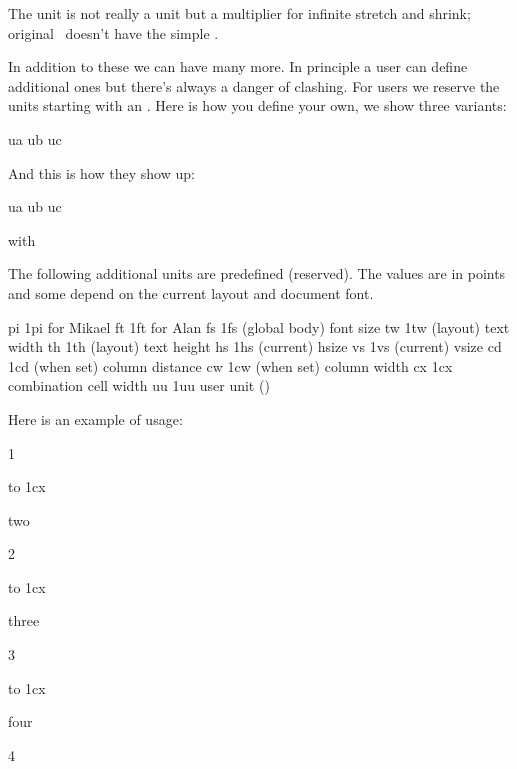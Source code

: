The  unit is not really a unit but a multiplier for infinite
stretch and shrink; original \TEX\ doesn't have the simple .

In addition to these we can have many more. In principle a user can define
additional ones but there's always a danger of clashing. For users we reserve the
units starting with an . Here is how you define your own, we show three
variants:

\startbuffer
\newdimension \FooA   \FooA 1.23pt
\newdimen     \FooB   \FooB 12.3pt
\protected\def\FooC   {\the\dimexpr\FooA +\FooB\relax}

\pushoverloadmode %
    \newuserunit\FooA ua
    \newuserunit\FooB ub
    \newuserunit\FooC uc
\popoverloadmode
\stopbuffer

\typebuffer[option=TEX] \getbuffer

And this is how they show up:

\startbuffer
\the{} ua \relax\quad
\the{} ub \relax\quad
\the{} uc \relax
\stopbuffer

\getbuffer

with

\typebuffer[option=TEX]

The following additional units are predefined (reserved). The values are in
points and some depend on the current layout and document font.

\starttabulate[|T|Tr|l|]
\NC pi \NC \thewithoutunit\dimexpr 1pi \NC {\tt\pi} for Mikael        \NC \NR
\NC ft \NC \thewithoutunit\dimexpr 1ft \NC {} for Alan      \NC \NR
\NC fs \NC \thewithoutunit\dimexpr 1fs \NC (global body) font size    \NC \NR
\NC tw \NC \thewithoutunit\dimexpr 1tw \NC (layout) text width        \NC \NR
\NC th \NC \thewithoutunit\dimexpr 1th \NC (layout) text height       \NC \NR
\NC hs \NC \thewithoutunit\dimexpr 1hs \NC (current) hsize            \NC \NR
\NC vs \NC \thewithoutunit\dimexpr 1vs \NC (current) vsize            \NC \NR
\NC cd \NC \thewithoutunit\dimexpr 1cd \NC (when set) column distance \NC \NR %
\NC cw \NC \thewithoutunit\dimexpr 1cw \NC (when set) column width    \NC \NR %
\NC cx \NC \thewithoutunit\dimexpr 1cx \NC combination cell width     \NC \NR
\NC uu \NC \thewithoutunit\dimexpr 1uu \NC user unit (\METAFUN)       \NC \NR
\stoptabulate

Here is an example of usage:

\startbuffer
{}   {1}
    { to 1cx{\strut two}}   {2}
    { to 1cx{\strut three}} {3}
    { to 1cx{\strut four}}  {4}
\stopcombination
\stopbuffer

